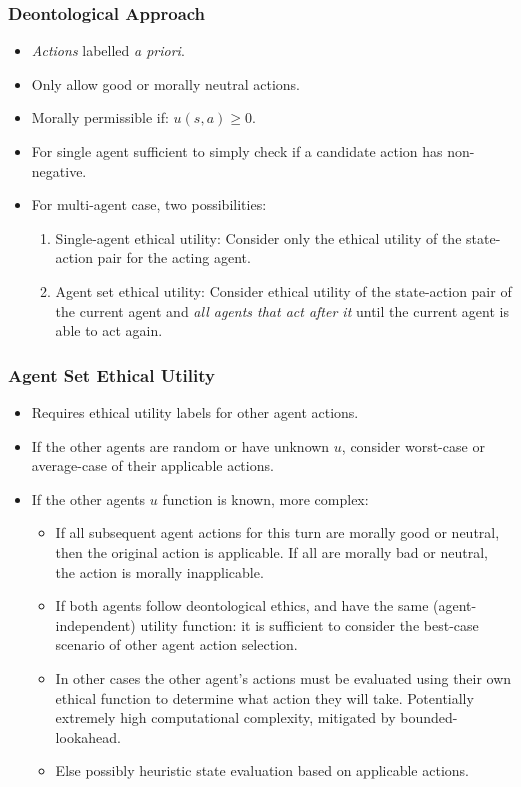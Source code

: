 \documentclass{beamer}
\begin{document}
 
\begin{frame}
\frametitle{Deontological Approach}
\begin{itemize}
\item \textit{Actions} labelled \textit{a priori}.
\item Only allow good or morally neutral actions.
\item Morally permissible if: $u(s,a) \geq 0$.
\item For single agent sufficient to simply check if a candidate action has non-negative.
\item For multi-agent case, two possibilities:
\begin{enumerate}
\item Single-agent ethical utility: Consider only the ethical utility of the state-action pair for the acting agent.
\item Agent set ethical utility: Consider ethical utility of the state-action pair of the current agent and \textit{all agents that act after it} until the current agent is able to act again.
\end{enumerate}
\end{itemize}
 \end{frame} 
 
 
 \begin{frame}
\frametitle{Agent Set Ethical Utility}
\begin{itemize}
\item Requires ethical utility labels for other agent actions.
\item If the other agents are random or have unknown $u$, consider worst-case or average-case of their applicable actions.
\item If the other agents $u$ function is known, more complex:
\begin{itemize}
\item If all subsequent agent actions for this turn are morally good or neutral, then the original action is applicable. If all are morally bad or neutral, the action is morally inapplicable. 
\item If both agents follow deontological ethics, and have the same (agent-independent) utility function: it is sufficient to consider the best-case scenario of other agent action selection.
\item In other cases the other agent's actions must be evaluated using their own ethical function to determine what action they will take. Potentially extremely high computational complexity, mitigated by bounded-lookahead.
\item Else possibly heuristic state evaluation based on applicable actions.
\end{itemize} 
\end{itemize}
 \end{frame} 
 
\end{document}
